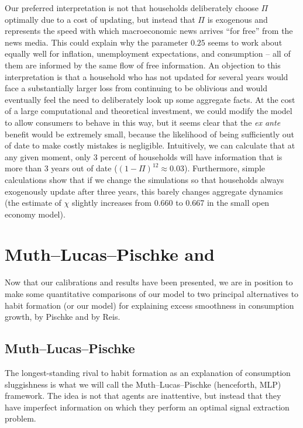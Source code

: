 \documentclass[titlepage]{./econtex}
\begin{document}
Our preferred interpretation is not that households deliberately choose $\Pi$ optimally due to a cost of updating, but instead that $\Pi$ is exogenous and represents the speed with which macroeconomic news arrives ``for free'' from the news media.  This could explain why the parameter $0.25$ seems to work about equally well for inflation, unemployment expectations, and consumption -- all of them are informed by the same flow of free information. An objection to this interpretation is that a household who has not updated for several years would face a substantially larger loss from continuing to be oblivious and would eventually feel the need to deliberately look up some aggregate facts.  At the cost of a large computational and theoretical investment, we could modify the model to allow consumers to behave in this way, but it seems clear that the {\it ex ante} benefit would be extremely small, because the likelihood of being sufficiently out of date to make costly mistakes is negligible.  Intuitively, we can calculate that at any given moment, only 3 percent of households will have information that is more than 3 years out of date ($(1-\Pi)^{12} \approx 0.03$).  Furthermore, simple calculations show that if we change the simulations so that households always exogenously update after three years, this barely changes aggregate dynamics (the estimate of $\chi$ slightly increases from 0.660 to 0.667 in the small open economy model).

\section{Muth--Lucas--Pischke and \cite{reis:inattentive}} \label{sec:Comparisons}

Now that our calibrations and results have been presented, we are in position to make some quantitative comparisons of our model to two principal alternatives to habit formation (or our model) for explaining excess smoothness in consumption growth, by Pischke and by Reis.

\subsection{Muth--Lucas--Pischke}
The longest-standing rival to habit formation as an explanation of consumption sluggishness is what we will call the Muth--Lucas--Pischke (henceforth, MLP) framework.  The idea is not that agents are inattentive, but instead that they have imperfect information on which they perform an optimal signal extraction problem.
\end{document}
